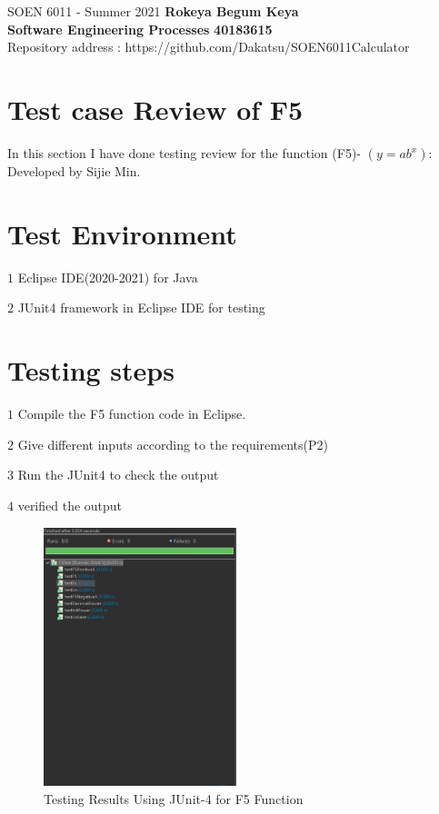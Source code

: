 \documentclass[letterpaper, 11pt]{report}
\begin{document}
\section*{}
\normalsize {SOEN 6011 - Summer 2021} \hfill \textbf{Rokeya Begum Keya} \\
\textbf{ Software Engineering Processes}  \hfill \textbf{40183615} \\
\hfill Repository address : https://github.com/Dakatsu/SOEN6011Calculator
\\

\section*{Test case Review of F5}
In this section I have done testing review for the function (F5)- $(y=ab^x)$: \\Developed by Sijie Min. 
\section*{Test Environment}
\item $1$  Eclipse IDE(2020-2021) for Java
\item $2$  JUnit4 framework in Eclipse IDE for
testing\cite{vogella} 
\section*{Testing steps}
\item $1$ Compile the F5 function code in Eclipse.
\item $2$ Give different inputs according to the requirements(P2)
\item $3$ Run the JUnit4 to check the output
\item $4$ verified the output 
\newpage
\begin{figure}[htb]
\includegraphics[width=0.5\textwidth]{F5}
\centering
\caption{Testing Results Using JUnit-4 for F5 Function}
\end{figure} \\\\
\end{document}
